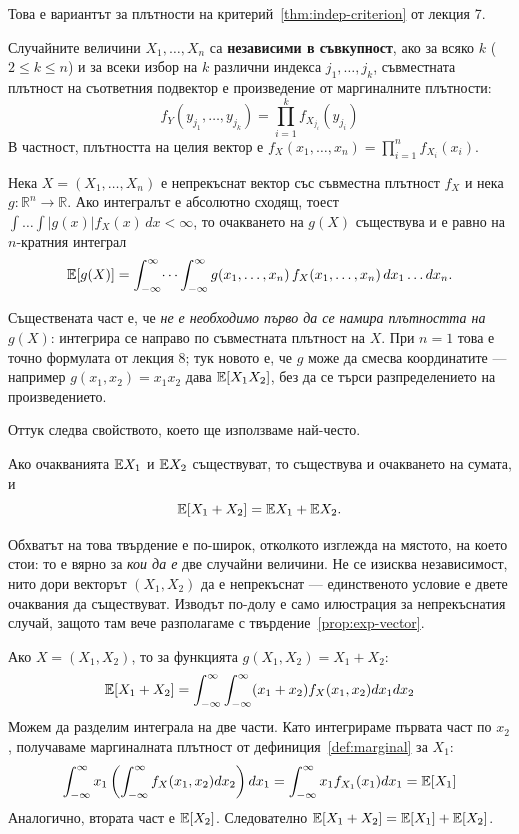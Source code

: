 Това е вариантът за плътности на критерий~\ref{thm:indep-criterion} от лекция 7.

Случайните величини $X_1, \dots, X_n$ са \textbf{независими в съвкупност}, ако за всяко $k$ ($2 \le k \le n$) и за всеки избор на $k$ различни индекса $j_1, \dots, j_k$, съвместната плътност на съответния подвектор е произведение от маргиналните плътности:
\[
f_Y(y_{j_1}, \dots, y_{j_k}) = \prod_{i=1}^{k} f_{X_{j_i}}(y_{j_i})
\]
В частност, плътността на целия вектор е $f_X(x_1, \dots, x_n) = \prod_{i=1}^n f_{X_i}(x_i)$.

\begin{prop}\label{prop:exp-vector}
Нека $X = (X_1, \dots, X_n)$ е непрекъснат вектор със съвместна плътност $f_X$ и нека
$g : \mathbb{R}^n \to \mathbb{R}$. Ако интегралът е абсолютно сходящ, тоест
$\int \dots \int |g(x)| f_X(x)\, dx < \infty$, то очакването на $g(X)$ съществува и е равно на
$n$-кратния интеграл
\[
\mathbb{E}[g(X)] = \int_{-\infty}^{\infty} \dots \int_{-\infty}^{\infty}
g(x_1, \dots, x_n)\, f_X(x_1, \dots, x_n)\, dx_1 \dots dx_n .
\]
\end{prop}

Съществената част е, че \emph{не е необходимо първо да се намира плътността на $g(X)$}:
интегрира се направо по съвместната плътност на $X$. При $n = 1$ това е точно формулата от
лекция 8; тук новото е, че $g$ може да смесва координатите — например $g(x_1,x_2) = x_1x_2$
дава $\mathbb{E}[X_1X_2]$, без да се търси разпределението на произведението.

Оттук следва свойството, което ще използваме най-често.

\begin{prop}\label{prop:linearity-vector}
Ако очакванията $\mathbb{E} X_1$ и $\mathbb{E} X_2$ съществуват, то съществува и очакването на сумата, и
\[
\mathbb{E}[X_1 + X_2] = \mathbb{E} X_1 + \mathbb{E} X_2 .
\]
\end{prop}

Обхватът на това твърдение е по-широк, отколкото изглежда на мястото, на което стои: то е
вярно за \emph{кои да е} две случайни величини. Не се изисква независимост, нито дори
векторът $(X_1, X_2)$ да е непрекъснат — единственото условие е двете очаквания да
съществуват. Изводът по-долу е само илюстрация за непрекъснатия случай, защото там вече
разполагаме с твърдение~\ref{prop:exp-vector}.

Ако $X = (X_1, X_2)$, то за функцията $g(X_1, X_2) = X_1 + X_2$:
\[
\mathbb{E}[X_1 + X_2] = \int_{-\infty}^{\infty} \int_{-\infty}^{\infty} (x_1 + x_2) f_X(x_1, x_2) dx_1 dx_2
\]
Можем да разделим интеграла на две части. Като интегрираме първата част по $x_2$, получаваме маргиналната плътност от дефиниция~\ref{def:marginal} за $X_1$:
\[
\int_{-\infty}^{\infty} x_1 \left( \int_{-\infty}^{\infty} f_X(x_1, x_2) dx_2 \right) dx_1 = \int_{-\infty}^{\infty} x_1 f_{X_1}(x_1) dx_1 = \mathbb{E}[X_1]
\]
Аналогично, втората част е $\mathbb{E}[X_2]$. Следователно $\mathbb{E}[X_1 + X_2] = \mathbb{E}[X_1] + \mathbb{E}[X_2]$.

